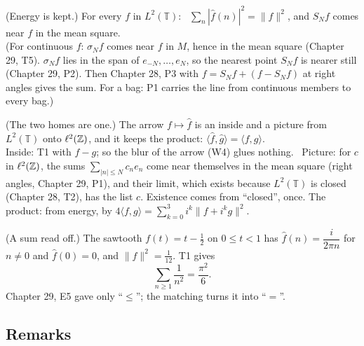 \begin{lines}
\item[\lab{T1}] (Energy is kept.) For every $f$ in $L^2(\mathbb{T})$: \ $\sum_n |\widehat f(n)|^2 = \|f\|^2$, and $S_N f$ comes near $f$ in the mean square. \\
(For continuous $f$: $\sigma_N f$ comes near $f$ in $M$, hence in the mean square (Chapter 29, T5). $\sigma_N f$ lies in the span of $e_{-N}, \dots, e_N$, so the nearest point $S_N f$ is nearer still (Chapter 29, P2). Then Chapter 28, P3 with $f = S_N f + (f - S_N f)$ at right angles gives the sum. For a bag: P1 carries the line from continuous members to every bag.)
\item[\lab{T2}] (The two homes are one.) The arrow $f \mapsto \widehat f$ is an inside and a picture from $L^2(\mathbb{T})$ onto $\ell^2(\mathbb{Z})$, and it keeps the product: $\langle \widehat f, \widehat g \rangle = \langle f, g \rangle$. \\
Inside: T1 with $f - g$; so the blur of the arrow (W4) glues nothing. \ Picture: for $c$ in $\ell^2(\mathbb{Z})$, the sums $\sum_{|n| \le N} c_n e_n$ come near themselves in the mean square (right angles, Chapter 29, P1), and their limit, which exists because $L^2(\mathbb{T})$ is closed (Chapter 28, T2), has the list $c$. Existence comes from ``closed'', once. The product: from energy, by $4\langle f, g \rangle = \sum_{k=0}^{3} i^k \|f + i^k g\|^2$.
\item[\lab{T3}] (A sum read off.) The sawtooth $f(t) = t - \tfrac12$ on $0 \le t < 1$ has $\widehat f(n) = \dfrac{i}{2\pi n}$ for $n \ne 0$ and $\widehat f(0) = 0$, and $\|f\|^2 = \tfrac1{12}$. T1 gives \[ \sum_{n \ge 1} \frac{1}{n^2} = \frac{\pi^2}{6}. \] Chapter 29, E5 gave only ``$\le$''; the matching turns it into ``$=$''.
\end{lines}

\subsection*{Remarks}

